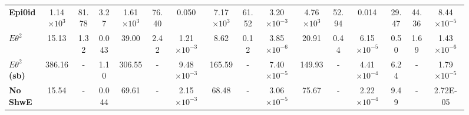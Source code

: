 \begin{sidewaysfigure}[!hb]
\begin{scriptsize}
\begin{tabular}{|l|ccc|ccc|ccc|ccc|ccc|}
\textbf{Epi0id}       & 1.14$\times 10^3$           & 81.78                                                               & 3.27                                       & 1.61$\times 10^3$             & 76.40                                                                 & 0.050                                        & 7.17$\times 10^3$              & 61.52                                                                  & 3.20$\times 10^{-3}$                                      & 4.76$\times 10^3$          & 52.94                                                              & 0.014                                     & 29.47                & 44.36                                                                 & 8.44$\times 10^{-5}$                                     \\
\rowcolor[HTML]{67FD9A}
\textbf{$E\theta^2$}      & 15.13              & 1.32                                                                & 0.043                                      & 39.00                & 2.42                                                                  & 1.21$\times 10^{-3}$                                     & 8.62                  & 0.12                                                                   & 3.85$\times 10^{-6}$                                      & 20.91             & 0.44                                                               & 6.15$\times 10^{-5}$                                  & 0.50                 & 1.69                                                                  & 1.43$\times 10^{-6}$                                  \\\hline\hline
\textbf{$E\theta^2$ (sb)}  & 386.16             & -                                                            & 1.10                                       & 306.55               & -                                                                & 9.48$\times 10^{-3}$                                     & 165.59                & -                                                               & 7.40$\times 10^{-5}$                                      & 149.93            & -                                                             & 4.41$\times 10^{-4}$                                  & 6.24                 & -                                                              & 1.79$\times 10^{-5}$                                     \\\hline\hline
\textbf{No ShwE}  & 15.54              & -                                                                & 0.044                                      & 69.61                & -                                                                 & 2.15$\times 10^{-3}$                                     & 68.48                 & - & 3.06$\times 10^{-5}$                                      & 75.67             & - & 2.22$\times 10^{-4}$                                  & 9.49                 & -                                                                & 2.72E-05   \\\hline
\end{tabular}


\end{scriptsize}
\end{sidewaysfigure}
